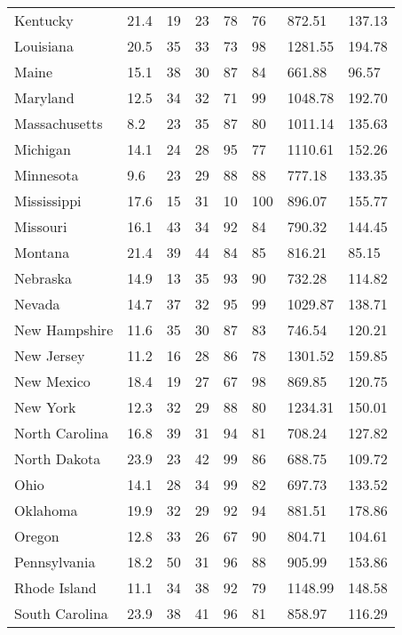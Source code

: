 \begin{tabular}{llllllll}
	 Kentucky             & 21.4 & 19 & 23 &  78 &  76 &  872.51 & 137.13\\
	 Louisiana            & 20.5 & 35 & 33 &  73 &  98 & 1281.55 & 194.78\\
	 Maine                & 15.1 & 38 & 30 &  87 &  84 &  661.88 &  96.57\\
	 Maryland             & 12.5 & 34 & 32 &  71 &  99 & 1048.78 & 192.70\\
	 Massachusetts        &  8.2 & 23 & 35 &  87 &  80 & 1011.14 & 135.63\\
	 Michigan             & 14.1 & 24 & 28 &  95 &  77 & 1110.61 & 152.26\\
	 Minnesota            &  9.6 & 23 & 29 &  88 &  88 &  777.18 & 133.35\\
	 Mississippi          & 17.6 & 15 & 31 &  10 & 100 &  896.07 & 155.77\\
	 Missouri             & 16.1 & 43 & 34 &  92 &  84 &  790.32 & 144.45\\
	 Montana              & 21.4 & 39 & 44 &  84 &  85 &  816.21 &  85.15\\
	 Nebraska             & 14.9 & 13 & 35 &  93 &  90 &  732.28 & 114.82\\
	 Nevada               & 14.7 & 37 & 32 &  95 &  99 & 1029.87 & 138.71\\
	 New Hampshire        & 11.6 & 35 & 30 &  87 &  83 &  746.54 & 120.21\\
	 New Jersey           & 11.2 & 16 & 28 &  86 &  78 & 1301.52 & 159.85\\
	 New Mexico           & 18.4 & 19 & 27 &  67 &  98 &  869.85 & 120.75\\
	 New York             & 12.3 & 32 & 29 &  88 &  80 & 1234.31 & 150.01\\
	 North Carolina       & 16.8 & 39 & 31 &  94 &  81 &  708.24 & 127.82\\
	 North Dakota         & 23.9 & 23 & 42 &  99 &  86 &  688.75 & 109.72\\
	 Ohio                 & 14.1 & 28 & 34 &  99 &  82 &  697.73 & 133.52\\
	 Oklahoma             & 19.9 & 32 & 29 &  92 &  94 &  881.51 & 178.86\\
	 Oregon               & 12.8 & 33 & 26 &  67 &  90 &  804.71 & 104.61\\
	 Pennsylvania         & 18.2 & 50 & 31 &  96 &  88 &  905.99 & 153.86\\
	 Rhode Island         & 11.1 & 34 & 38 &  92 &  79 & 1148.99 & 148.58\\
	 South Carolina       & 23.9 & 38 & 41 &  96 &  81 &  858.97 & 116.29\\

\end{tabular}
